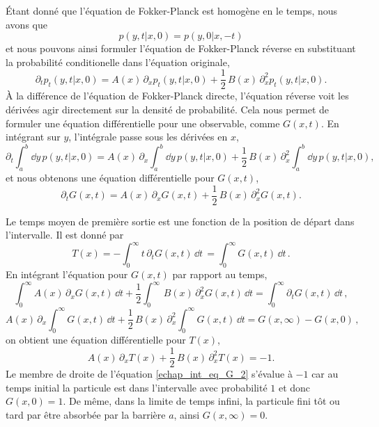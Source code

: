 \documentclass[openany,a4paper,12pt]{article}
\begin{document}
\par Étant donné que l'équation de Fokker-Planck est homogène en le temps, nous avons que 
%
\begin{equation}\label{echap_homogeneite_p}
	p(y,t|x,0) = p(y,0|x,-t)
\end{equation}
%
et nous pouvons ainsi formuler l'équation de Fokker-Planck réverse en substituant la probabilité conditionelle dans l'équation originale,
%
\begin{equation}\label{echap_eq_FP_backward}
	\partial_t p_t(y,t|x,0) = A(x)\, \partial_x p_t(y,t|x,0) + \frac 12 \, B(x)\, \partial_x^2 p_t(y,t|x,0).
\end{equation}
%
À la différence de l'équation de Fokker-Planck directe, l'équation réverse voit les dérivées agir directement sur la densité de probabilité. Cela nous permet de formuler une équation différentielle pour une observable, comme $G(x,t)$. En intégrant sur $y$, l'intégrale passe sous les dérivées en $x$,
%
\begin{equation}\label{echao_int_FP_backward}
	\partial_t \int_a^b \dd y \, p(y,t|x,0) = A(x) \, \partial_x \int_a^b \dd y \, p(y,t|x,0) + \frac 12 \, B(x) \, \partial_x^2 \int_a^b \dd y \, p(y,t|x,0),
\end{equation}
%
et nous obtenons une équation différentielle pour $G(x,t)$,
%
\begin{equation}\label{echap_eq_G}
	\partial_t G(x,t) = A(x) \, \partial_x G(x,t) + \frac 12 \, B(x) \, \partial_x^2 G(x,t).
\end{equation}
%

\par Le temps moyen de première sortie est une fonction de la position de départ dans l'intervalle. Il est donné par
%
\begin{equation}\label{echap_expr_Tx}
	T(x) = - \int_0^\infty t \, \partial_t G(x,t) \, \dd t \, = \int_0^\infty  G(x,t) \, \dd t \, .
\end{equation}
%
En intégrant l'équation pour $G(x,t)$ par rapport au temps,
%
\begin{equation}\label{echap_int_eq_G_1}
	 \int_0^\infty A(x) \, \partial_x G(x,t) \, \dd t + \frac 12 \int_0^\infty \, B(x) \, \partial_x^2 G(x,t) \, \dd t = \int_0^\infty \partial_t G(x,t) \, \dd t \, ,
\end{equation}
%
\begin{equation}\label{echap_int_eq_G_2}
	A(x) \, \partial_x \int_0^\infty G(x,t) \, \dd t + \frac 12 \, B(x) \, \partial_x^2 \int_0^\infty G(x,t) \, \dd t = G(x,\infty) - G(x,0) \, ,
\end{equation}
%
on obtient une équation différentielle pour $T(x)$,
%
\begin{equation}\label{echap_eq_T}
	A(x) \, \partial_x T(x) + \frac 12 \, B(x) \, \partial_x^2 T(x) = -1.
\end{equation}
%
Le membre de droite de l'équation \ref{echap_int_eq_G_2} s'évalue à $-1$ car au temps initial la particule est dans l'intervalle avec probabilité $1$ et donc $G(x,0)=1$. De même, dans la limite de temps infini, la particule fini tôt ou tard par être absorbée par la barrière $a$, ainsi $G(x,\infty)=0$. 
\end{document}
